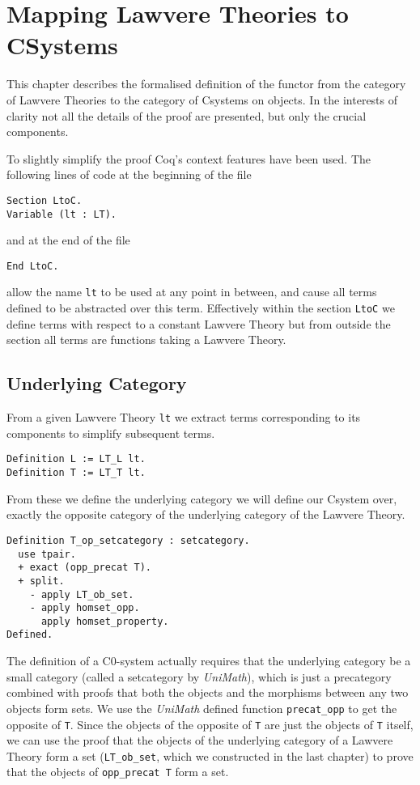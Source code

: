 \chapter{Mapping Lawvere Theories to CSystems}
This chapter describes the formalised definition of the functor from the
category of Lawvere Theories to the category of Csystems on objects. In the
interests of clarity not all the details of the proof are presented, but only
the crucial components.

To slightly simplify the proof Coq's context features have been used. The
following lines of code at the beginning of the file
\begin{lstlisting}
Section LtoC.
Variable (lt : LT).
\end{lstlisting}
and at the end of the file
\begin{lstlisting}
End LtoC.
\end{lstlisting}
allow the name \lstinline|lt| to be used at any point in between, and cause all terms
defined to be abstracted over this term. Effectively within the section
\lstinline|LtoC| we define terms with respect to a constant Lawvere Theory but from
outside the section all terms are functions taking a Lawvere Theory.

\section{Underlying Category}
From a given Lawvere Theory \lstinline|lt| we extract terms corresponding to its
components to simplify subsequent terms.
\begin{lstlisting}
Definition L := LT_L lt.
Definition T := LT_T lt.
\end{lstlisting}

From these we define the underlying category we will define our Csystem over,
exactly the opposite category of the underlying category of the Lawvere Theory.
\begin{lstlisting}
Definition T_op_setcategory : setcategory.
  use tpair.
  + exact (opp_precat T).
  + split.
    - apply LT_ob_set.
    - apply homset_opp.
      apply homset_property.
Defined.
\end{lstlisting}
The definition of a C0-system actually requires that the underlying category be
a small category (called a setcategory by \textit{UniMath}), which is just a
precategory combined with proofs that both the objects and the morphisms between
any two objects form sets. We use the \textit{UniMath} defined function
\lstinline|precat_opp| to get the opposite of \lstinline|T|. Since the objects of the
opposite of \lstinline|T| are just the objects of \lstinline|T| itself, we can use the
proof that the objects of the underlying category of a Lawvere Theory form a set
(\lstinline|LT_ob_set|, which we constructed in the last chapter) to prove that the
objects of \lstinline|opp_precat T| form a set. 

